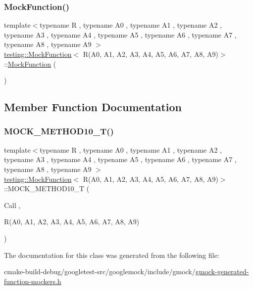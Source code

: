 \subsubsection{\texorpdfstring{MockFunction()}{MockFunction()}}
{\footnotesize\ttfamily template$<$typename R , typename A0 , typename A1 , typename A2 , typename A3 , typename A4 , typename A5 , typename A6 , typename A7 , typename A8 , typename A9 $>$ \\
\mbox{\hyperlink{classtesting_1_1MockFunction}{testing\+::\+Mock\+Function}}$<$ R(A0, A1, A2, A3, A4, A5, A6, A7, A8, A9)$>$\+::\mbox{\hyperlink{classtesting_1_1MockFunction}{Mock\+Function}} (\begin{DoxyParamCaption}{ }\end{DoxyParamCaption})\hspace{0.3cm}{\ttfamily [inline]}}



\subsection{Member Function Documentation}
\mbox{\label{classtesting_1_1MockFunction_3_01R_07A0_00_01A1_00_01A2_00_01A3_00_01A4_00_01A5_00_01A6_00_01A7_00_01A8_00_01A9_08_4_adb493fcbb4936734eda9cf99b4d0acd0}} 
\subsubsection{\texorpdfstring{MOCK\_METHOD10\_T()}{MOCK\_METHOD10\_T()}}
{\footnotesize\ttfamily template$<$typename R , typename A0 , typename A1 , typename A2 , typename A3 , typename A4 , typename A5 , typename A6 , typename A7 , typename A8 , typename A9 $>$ \\
\mbox{\hyperlink{classtesting_1_1MockFunction}{testing\+::\+Mock\+Function}}$<$ R(A0, A1, A2, A3, A4, A5, A6, A7, A8, A9)$>$\+::M\+O\+C\+K\+\_\+\+M\+E\+T\+H\+O\+D10\+\_\+T (\begin{DoxyParamCaption}\item[{Call}]{,  }\item[{R(A0, A1, A2, A3, A4, A5, A6, A7, A8, A9)}]{ }\end{DoxyParamCaption})}



The documentation for this class was generated from the following file\+:\begin{DoxyCompactItemize}
\item 
cmake-\/build-\/debug/googletest-\/src/googlemock/include/gmock/\mbox{\hyperlink{gmock-generated-function-mockers_8h}{gmock-\/generated-\/function-\/mockers.\+h}}\end{DoxyCompactItemize}
